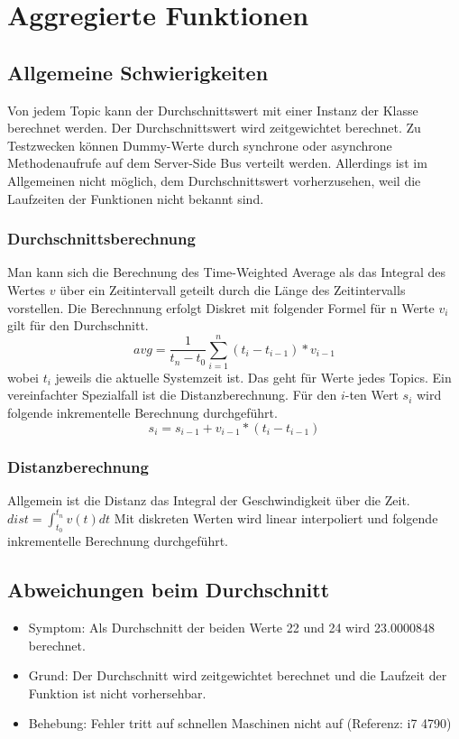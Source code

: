 \documentclass[qualitaetssicherung.tex]{subfiles}
\begin{document}
\section{Aggregierte Funktionen}

	\subsection*{Allgemeine Schwierigkeiten} 
		Von jedem Topic kann der Durchschnittswert mit einer Instanz der Klasse  berechnet werden. Der Durchschnittswert wird zeitgewichtet berechnet. Zu Testzwecken können Dummy-Werte durch synchrone oder asynchrone Methodenaufrufe auf dem Server-Side Bus verteilt werden. Allerdings ist im Allgemeinen nicht möglich, dem Durchschnittswert vorherzusehen, weil die Laufzeiten der Funktionen nicht bekannt sind.

		\subsubsection{Durchschnittsberechnung} 
		Man kann sich die Berechnung des Time-Weighted Average als das Integral des Wertes $v$ über ein Zeitintervall geteilt durch die Länge des Zeitintervalls vorstellen. Die Berechnnung erfolgt Diskret mit folgender Formel für n Werte $v_i$ gilt für den Durchschnitt.
		\begin{equation} \label{EQAVG}
			avg = \frac{1}{t_n - t_0} \sum_{i = 1}^{n} (t_i - t_{i-1}) * v_{i-1}
		\end{equation}
		 wobei $t_i$ jeweils die aktuelle Systemzeit ist. Das geht für Werte jedes Topics. Ein vereinfachter Spezialfall ist die Distanzberechnung. Für den $i$-ten Wert $s_i$ wird folgende inkrementelle Berechnung durchgeführt.
		 \begin{equation} \label{EQDIST}
		 	s_{i} = s_{i-1} + v_{i-1} * (t_i - t_{i-1})	
		 \end{equation}

		\subsubsection{Distanzberechnung} 

		Allgemein ist die Distanz das Integral der Geschwindigkeit über die Zeit. $dist = \int_{t_0}^{t_n} v(t) dt$ Mit diskreten Werten wird linear interpoliert und folgende inkrementelle Berechnung durchgeführt.



	\subsection{Abweichungen beim Durchschnitt} \label{DAVG}
		\begin{itemize}
			\item
			Symptom: Als Durchschnitt der beiden Werte 22 und 24 wird 23.0000848 berechnet.
			\item
			Grund: Der Durchschnitt wird zeitgewichtet berechnet und die Laufzeit der Funktion ist nicht vorhersehbar.
			\item
			Behebung: Fehler tritt auf schnellen Maschinen nicht auf (Referenz: i7 4790)

		\end{itemize}
\end{document}
